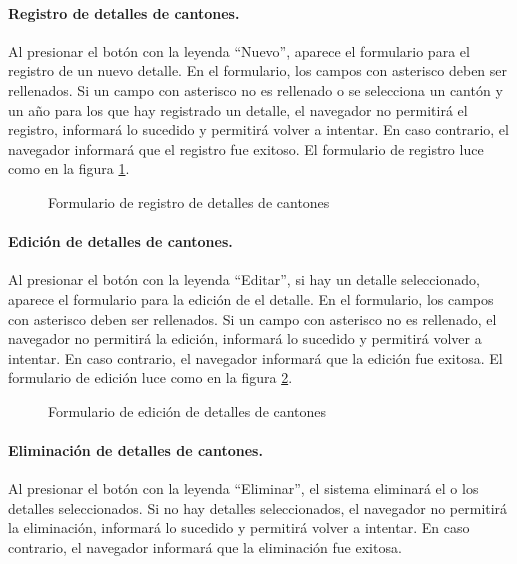 \documentclass[a4paper, 9pt, conference]{article}              %
\begin{document}
\paragraph{Registro de detalles de cantones.}

Al presionar el bot\'on con la leyenda ``Nuevo'', aparece el formulario para el registro de un nuevo detalle. En el formulario, los campos con asterisco deben ser rellenados. Si un campo con asterisco no es rellenado o se selecciona un cant\'on y un a\~no para los que hay registrado un detalle, el navegador no permitir\'a el registro, informar\'a lo sucedido y permitir\'a volver a intentar. En caso contrario, el navegador informar\'a que el registro fue exitoso. El formulario de registro luce como en la figura \ref{fig:geocantonsdetailnew}.

\begin{figure}
	\centering
		\caption{Formulario de registro de detalles de cantones}
	\label{fig:geocantonsdetailnew}
\end{figure}

\paragraph{Edici\'on de detalles de cantones.}

Al presionar el bot\'on con la leyenda ``Editar'', si hay un detalle seleccionado, aparece el formulario para la edici\'on de el detalle. En el formulario, los campos con asterisco deben ser rellenados. Si un campo con asterisco no es rellenado, el navegador no permitir\'a la edici\'on, informar\'a lo sucedido y permitir\'a volver a intentar. En caso contrario, el navegador informar\'a que la edici\'on fue exitosa. El formulario de edici\'on luce como en la figura \ref{fig:geocantonsdetailedit}.

\begin{figure}
	\centering
		\caption{Formulario de edici\'on de detalles de cantones}
	\label{fig:geocantonsdetailedit}
\end{figure}

\paragraph{Eliminaci\'on de detalles de cantones.}

Al presionar el bot\'on con la leyenda ``Eliminar'', el sistema eliminar\'a el o los detalles seleccionados. Si no hay detalles seleccionados, el navegador no permitir\'a la eliminaci\'on, informar\'a lo sucedido y permitir\'a volver a intentar. En caso contrario, el navegador informar\'a que la eliminaci\'on fue exitosa.
\end{document}
